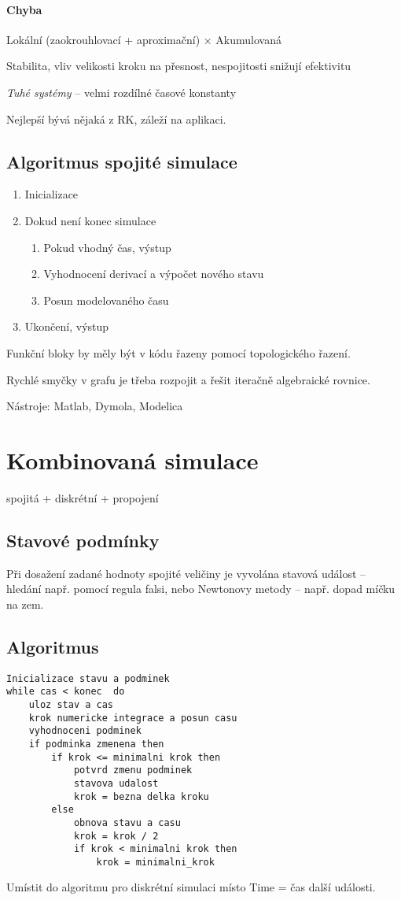\documentclass[a4paper, 11pt]{report}
\begin{document}
\paragraph{Chyba}
Lokální (zaokrouhlovací + aproximační) $\times$ Akumulovaná

Stabilita, vliv velikosti kroku na přesnost, nespojitosti snižují efektivitu

\emph{Tuhé systémy} -- velmi rozdílné časové konstanty

Nejlepší bývá nějaká z RK, záleží na aplikaci.

\subsection{Algoritmus spojité simulace}
\begin{enumerate}
	\item Inicializace
	\item Dokud není konec simulace
	\begin{enumerate}
		\item Pokud vhodný čas, výstup
		\item Vyhodnocení derivací a výpočet nového stavu
		\item Posun modelovaného času
	\end{enumerate}
	\item Ukončení, výstup
\end{enumerate}

Funkční bloky by měly být v kódu řazeny pomocí topologického řazení.

Rychlé smyčky v grafu je třeba rozpojit a řešit iteračně algebraické rovnice.

Nástroje: Matlab, Dymola, Modelica

\section{Kombinovaná simulace}
spojitá + diskrétní + propojení

\subsection{Stavové podmínky}
Při dosažení zadané hodnoty spojité veličiny je vyvolána stavová událost -- hledání např. pomocí regula falsi, nebo Newtonovy metody -- např. dopad míčku na zem.

\subsection{Algoritmus}
\begin{lstlisting}
Inicializace stavu a podminek
while cas < konec  do
	uloz stav a cas
	krok numericke integrace a posun casu
	vyhodnoceni podminek
	if podminka zmenena then
		if krok <= minimalni krok then
			potvrd zmenu podminek
			stavova udalost
			krok = bezna delka kroku
		else
			obnova stavu a casu
			krok = krok / 2
			if krok < minimalni krok then
				krok = minimalni_krok
\end{lstlisting}
Umístit do algoritmu pro diskrétní simulaci místo Time = čas další události.
\end{document}
